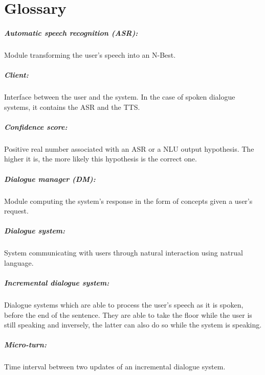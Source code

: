 \chapter*{Glossary}

\paragraph{Automatic speech recognition (ASR):} Module transforming the user's speech into an N-Best.

\paragraph{Client:} Interface between the user and the system. In the case of spoken dialogue systems, it contains the ASR and the TTS.

\paragraph{Confidence score:} Positive real number associated with an ASR or a NLU output hypothesis. The higher it is, the more likely this hypothesis is the correct one.

\paragraph{Dialogue manager (DM):} Module computing the system's response in the form of concepts given a user's request.

\paragraph{Dialogue system:} System communicating with users through natural interaction using natrual language.

\paragraph{Incremental dialogue system:} Dialogue systems which are able to process the user's speech as it is spoken, before the end of the sentence. They are able to take the floor while the user is still speaking and inversely, the latter can also do so while the system is speaking.

\paragraph{Micro-turn:} Time interval between two updates of an incremental dialogue system.

